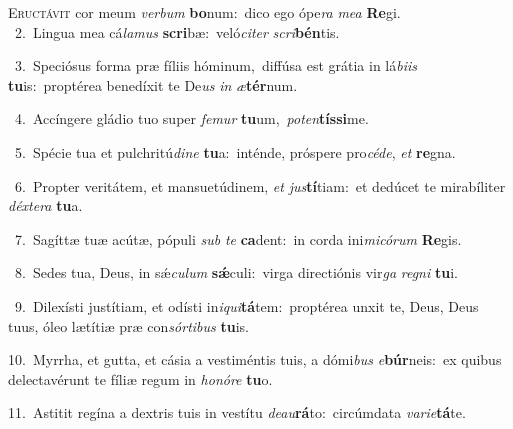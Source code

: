 \lettrine{\initial\textcolor{\initialcolor}{E}}{ructávit} cor meum \textit{ver}\-\textit{bum} \textbf{bo}\-num:~\star dico ego ópe\textit{ra} \textit{me}\-\textit{a} \textbf{Re}\-gi.\\
{\numbfont\textcolor{\numbcolor}{~2.}}~Lingua mea cá\-\textit{la}\-\textit{mus} \textbf{scri}\-bæ:~\star veló\-\textit{ci}\-\textit{ter} \textit{scri}\-\textbf{bén}tis.\par
{\numbfont\textcolor{\numbcolor}{~3.}}~Speciósus forma præ fíliis hóminum,~\dagger diffúsa est grátia in lá\-\textit{bi}\-\textit{is} \textbf{tu}\-is:~\star proptérea benedíxit te De\textit{us} \textit{in} \textit{æ}\-\textbf{tér}num.\par
{\numbfont\textcolor{\numbcolor}{~4.}}~Accíngere gládio tuo super \textit{fe}\-\textit{mur} \textbf{tu}\-um,~\star \textit{pot}\-\textit{en}\textbf{tís}\textbf{si}me.\par
{\numbfont\textcolor{\numbcolor}{~5.}}~Spécie tua et pulchritú\-\textit{di}\-\textit{ne} \textbf{tu}\-a:~\star inténde, próspere pro\-\textit{cé}\-\textit{de}, \textit{et} \textbf{re}\-gna.\par
{\numbfont\textcolor{\numbcolor}{~6.}}~Propter veritátem, et mansuetúdinem, \textit{et} \textit{jus}\-\textbf{tí}tiam:~\star et dedúcet te mirabíliter \textit{déx}\-\textit{te}\textit{ra} \textbf{tu}\-a.\par
{\numbfont\textcolor{\numbcolor}{~7.}}~Sagíttæ tuæ acútæ, pópuli \textit{sub} \textit{te} \textbf{ca}\-dent:~\star in corda ini\-\textit{mi}\-\textit{có}\textit{rum} \textbf{Re}\-gis.\par
{\numbfont\textcolor{\numbcolor}{~8.}}~Sedes tua, Deus, in sǽ\-\textit{cu}\-\textit{lum} \textbf{sǽ}\-culi:~\star virga directiónis vir\textit{ga} \textit{re}\-\textit{gni} \textbf{tu}\-i.\par
{\numbfont\textcolor{\numbcolor}{~9.}}~Dilexísti justítiam, et odísti in\-\textit{i}\-\textit{qui}\textbf{tá}tem:~\star proptérea unxit te, Deus, Deus tuus, óleo lætítiæ præ con\-\textit{sór}\-\textit{ti}\textit{bus} \textbf{tu}\-is.\par
{\numbfont\textcolor{\numbcolor}{10.}}~Myrrha, et gutta, et cásia a vestiméntis tuis, a dómi\textit{bus} \textit{e}\-\textbf{búr}neis:~\star ex quibus delectavérunt te fíliæ regum in \textit{ho}\-\textit{nó}\textit{re} \textbf{tu}\-o.\par
{\numbfont\textcolor{\numbcolor}{11.}}~Astitit regína a dextris tuis in vestítu \textit{de}\-\textit{au}\textbf{rá}to:~\star circúmdata \textit{va}\-\textit{ri}\textit{e}\textbf{tá}te.\par
